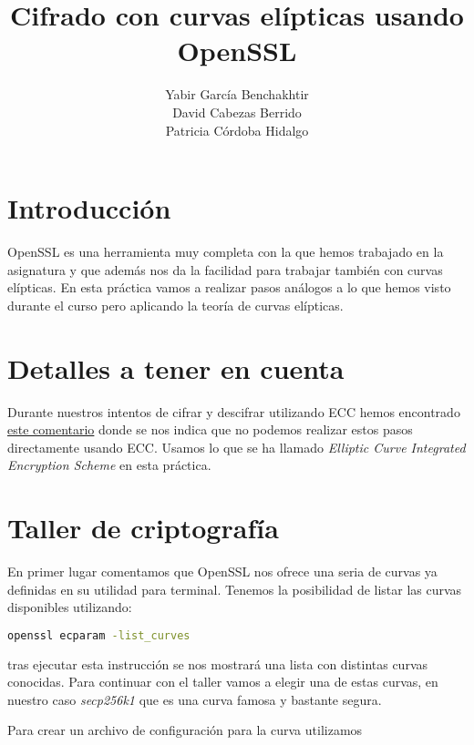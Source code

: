 \documentclass{article}
\begin{document}
\title{\Huge \textbf{Cifrado con curvas elípticas usando OpenSSL}} \author{Yabir
García Benchakhtir\\ David Cabezas Berrido\\ Patricia Córdoba Hidalgo
} \date{}
\maketitle

\section{Introducción}

OpenSSL es una herramienta muy completa con la que hemos trabajado en la
asignatura y que además nos da la facilidad para trabajar también con curvas
elípticas. En esta práctica vamos a realizar pasos análogos a lo que hemos visto
durante el curso pero aplicando la teoría de curvas elípticas. 

\section{Detalles a tener en cuenta}

Durante nuestros intentos de cifrar y descifrar utilizando ECC hemos encontrado
\href{https://stackoverflow.com/a/58942471/2588566}{este comentario} donde se
nos indica que no podemos realizar estos pasos directamente usando ECC. Usamos
lo que se ha llamado \textit{Elliptic Curve Integrated Encryption Scheme} en
esta práctica.

\section{Taller de criptografía}

En primer lugar comentamos que OpenSSL nos ofrece una seria de curvas ya
definidas en su utilidad para terminal. Tenemos la posibilidad de listar las
curvas disponibles utilizando:

\begin{lstlisting}[language=bash]
  openssl ecparam -list_curves
\end{lstlisting}

tras ejecutar esta instrucción se nos mostrará una lista con distintas curvas
conocidas. Para continuar con el taller vamos a elegir una de estas curvas,
en nuestro caso \textit{secp256k1} que es una curva famosa y bastante segura.

Para crear un archivo de configuración para la curva utilizamos 
\end{document}
